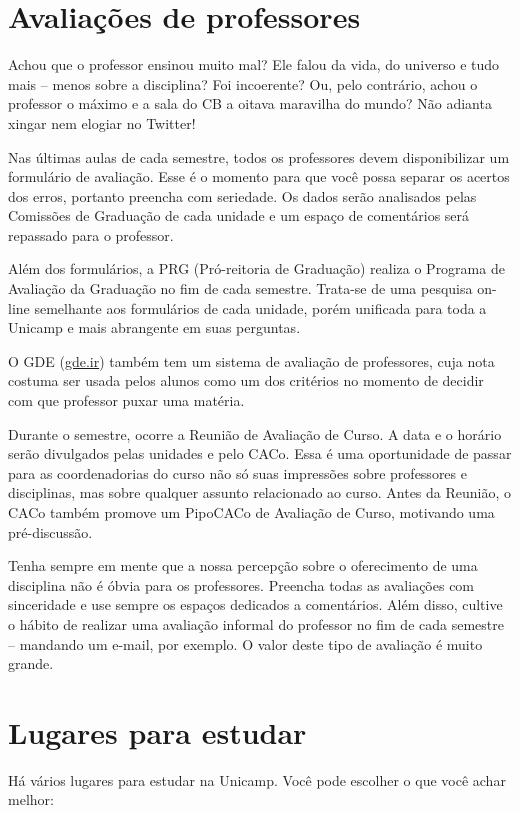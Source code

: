 \section{Avaliações de professores}

Achou que o professor ensinou muito mal? Ele falou da vida, do universo e tudo
mais -- menos sobre a disciplina? Foi incoerente? Ou, pelo contrário, achou o
professor o máximo e a sala do CB a oitava maravilha do mundo? Não adianta
xingar nem elogiar no Twitter!

Nas últimas aulas de cada semestre, todos os professores devem disponibilizar um
formulário de avaliação. Esse é o momento para que você possa separar os acertos
dos erros, portanto preencha com seriedade. Os dados serão analisados pelas
Comissões de Graduação de cada unidade e um espaço de comentários será repassado
para o professor.

Além dos formulários, a PRG (Pró-reitoria de Graduação) realiza o Programa de
Avaliação da Graduação no fim de cada semestre. Trata-se de uma pesquisa on-line
semelhante aos formulários de cada unidade, porém unificada para toda a Unicamp
e mais abrangente em suas perguntas.

O GDE (\url{gde.ir}) também tem um sistema de avaliação de professores, cuja nota
costuma ser usada pelos alunos como um dos critérios no momento de decidir com
que professor puxar uma matéria.

Durante o semestre, ocorre a Reunião de Avaliação de Curso. A data e o horário
serão divulgados pelas unidades e pelo CACo. Essa é uma oportunidade de passar
para as coordenadorias do curso não só suas impressões sobre professores e disciplinas,
mas sobre qualquer assunto relacionado ao curso. Antes da Reunião, o CACo também
promove um PipoCACo de Avaliação de Curso, motivando uma pré-discussão.

Tenha sempre em mente que a nossa percepção sobre o oferecimento de uma disciplina
não é óbvia para os professores. Preencha todas as avaliações com sinceridade
e use sempre os espaços dedicados a comentários. Além disso, cultive o hábito de
realizar uma avaliação informal do professor no fim de cada semestre -- mandando
um e-mail, por exemplo. O valor deste tipo de avaliação é muito grande.

\newpage
\section{Lugares para estudar}

Há vários lugares para estudar na Unicamp. Você pode escolher o que você achar
melhor:


